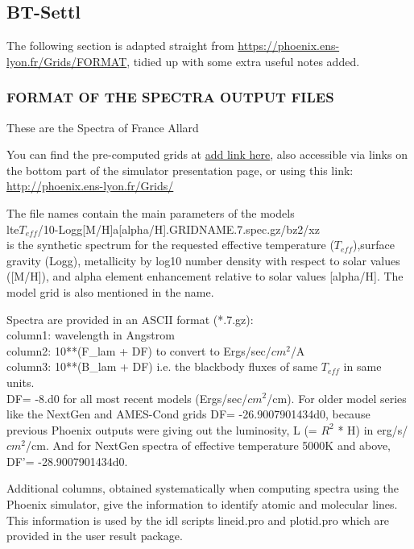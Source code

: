 \documentclass[12pt, a4paper]{article}
\begin{document}
\subsection{BT-Settl}

The following section is adapted straight from \url{https://phoenix.ens-lyon.fr/Grids/FORMAT}, tidied up with some extra useful notes added.

\subsubsection{FORMAT OF THE SPECTRA OUTPUT FILES}
These are the Spectra of France Allard

You can find the  pre-computed grids at \href{}{\url{add link here}}, also accessible via links on
the bottom part of the simulator presentation page, or using this link:
\href{http://phoenix.ens-lyon.fr/Grids/}{\url{http://phoenix.ens-lyon.fr/Grids/}}

The file names contain the main parameters of the models\\
lte{\(T_{eff}\)/10}-{Logg}{[M/H]}a[alpha/H].GRIDNAME.7.spec.gz/bz2/xz\\
is the synthetic spectrum for the requested effective temperature
(\(T_{eff}\)),surface gravity (Logg), metallicity by log10 number density with
respect to solar values ([M/H]), and alpha element enhancement relative     
to solar values [alpha/H]. The model grid is also mentioned in the name.

Spectra are provided in an ASCII format (*.7.gz):\\
	column1: wavelength in Angstrom\\
	column2: 10**(F\_lam + DF) to convert to Ergs/sec/\({cm}^2\)/A\\
	column3: 10**(B\_lam + DF) i.e. the blackbody fluxes of same \(T_{eff}\) in same units.\\


DF= -8.d0 for all most recent models (Ergs/sec/\({cm}^2\)/cm). For older model
series like the NextGen and AMES-Cond grids DF= -26.9007901434d0, 
because previous Phoenix outputs were giving out the luminosity, 
L (= \(R^2\) * H) in erg/s/\({cm}^2\)/cm.  And for NextGen spectra
of effective temperature 5000K and above, DF'= -28.9007901434d0.

Additional columns, obtained systematically when computing spectra using the
Phoenix simulator, give the information to identify atomic and molecular
lines. This information is used by the idl scripts lineid.pro and plotid.pro 
which are provided in the user result package.  
\end{document}
